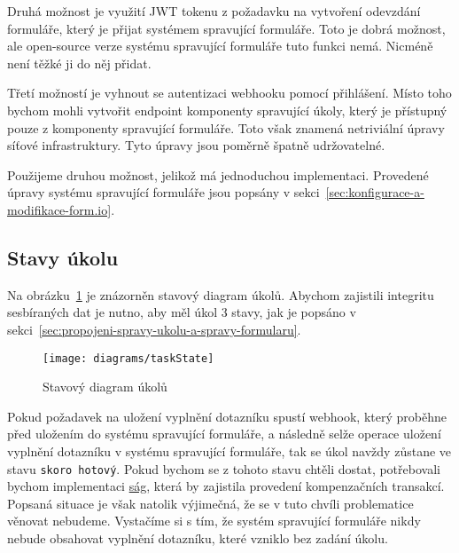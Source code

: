 Druhá možnost je využití JWT tokenu z požadavku na vytvoření odevzdání formuláře, který je přijat systémem spravující formuláře.
Toto je dobrá možnost, ale open-source verze systému spravující formuláře tuto funkci nemá.
Nicméně není těžké ji do něj přidat.

Třetí možností je vyhnout se autentizaci webhooku pomocí přihlášení.
Místo toho bychom mohli vytvořit endpoint komponenty spravující úkoly, který je přístupný pouze z komponenty spravující formuláře.
Toto však znamená netriviální úpravy síťové infrastruktury.
Tyto úpravy jsou poměrně špatně udržovatelné.

Použijeme druhou možnost, jelikož má jednoduchou implementaci.
Provedené úpravy systému spravující formuláře jsou popsány v sekci~\ref{sec:konfigurace-a-modifikace-form.io}.

\subsection{Stavy úkolu}\label{subsec:stavy-ukolu}

Na obrázku~\ref{fig:task-state} je znázorněn stavový diagram úkolů.
Abychom zajistili integritu sesbíraných dat je nutno, aby měl úkol 3 stavy, jak je popsáno v sekci~\ref{sec:propojeni-spravy-ukolu-a-spravy-formularu}.

\begin{figure}[H]
    \texttt{[image: diagrams/taskState]}
    \caption{Stavový diagram úkolů}\label{fig:task-state}
\end{figure}

Pokud požadavek na uložení vyplnění dotazníku spustí webhook, který proběhne před uložením do systému spravující formuláře, a následně selže operace uložení vyplnění dotazníku v systému spravující formuláře, tak se úkol navždy zůstane ve stavu \texttt{skoro hotový}.
Pokud bychom se z tohoto stavu chtěli dostat, potřebovali bychom implementaci \href{https://microservices.io/patterns/data/saga.html}{ság}, která by zajistila provedení kompenzačních transakcí.
Popsaná situace je však natolik výjimečná, že se v tuto chvíli problematice věnovat nebudeme.
Vystačíme si s tím, že systém spravující formuláře nikdy nebude obsahovat vyplnění dotazníku, které vzniklo bez zadání úkolu.